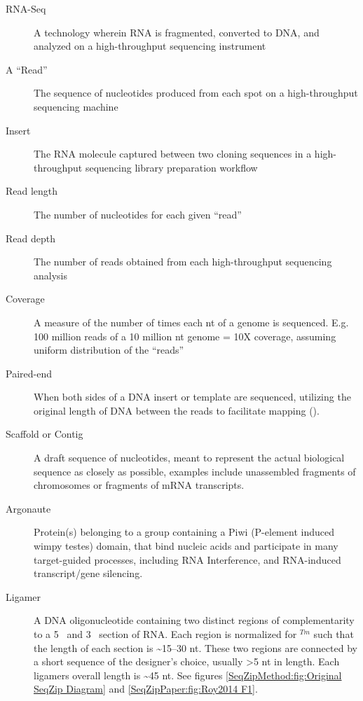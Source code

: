 \label{hd:Definitions} \listDefinitions

\begin{description}
  \item[RNA-Seq]
  A technology wherein RNA is fragmented, converted to DNA, and analyzed on a high-throughput sequencing instrument

  \item[A ``Read'']
  The sequence of nucleotides produced from each spot on a high-throughput sequencing machine

  \item[Insert]
  The RNA molecule captured between two cloning sequences in a high-throughput sequencing library preparation workflow

  \item[Read length]
  The number of nucleotides for each given ``read''

  \item[Read depth]
  The number of reads obtained from each high-throughput sequencing analysis

  \item[Coverage]
  A measure of the number of times each nt of a genome is sequenced. E.g. 100 million reads of a 10 million nt genome = 10X coverage, assuming uniform distribution of the ``reads''

  \item[Paired-end]
  When both sides of a DNA insert or template are sequenced, utilizing the original length of DNA between the reads to facilitate mapping (\cite{Roach1995}).

  \item[Scaffold or Contig]
  A draft sequence of nucleotides, meant to represent the actual biological sequence as closely as possible, examples include unassembled fragments of chromosomes or fragments of mRNA transcripts.

  \item[Argonaute]
  Protein(s) belonging to a group containing a Piwi (P-element induced wimpy testes) domain, that bind nucleic acids and participate in many target-guided processes, including RNA Interference, and RNA-induced transcript/gene silencing.

  \item[Ligamer]
  A DNA oligonucleotide containing two distinct regions of complementarity to a 5\textprime~ and 3\textprime~ section of RNA. Each region is normalized for $^{Tm}$ such that the length of each section is \textasciitilde15--30 nt. These two regions are connected by a short sequence of the designer's choice, usually >5 nt in length. Each ligamers overall length is \textasciitilde45 nt. See figures \ref{SeqZipMethod:fig:Original SeqZip Diagram} and \ref{SeqZipPaper:fig:Roy2014 F1}.
  
  \end{description}
  \clearpage %